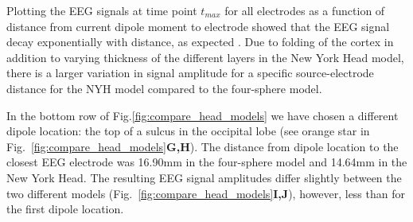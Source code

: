 \documentclass[preprint,10pt,authoryear]{elsarticle}
\begin{document}
{Plotting the EEG signals at time point $t_{max}$ for all electrodes as a function of distance from current dipole moment to electrode showed that the EEG signal decay exponentially with distance, as expected \citep{NUNEZ2006}. Due to folding of the cortex in addition to varying thickness of the different layers in the New York Head model, there is a larger variation in signal amplitude for a specific source-electrode distance for the NYH model compared to the four-sphere model.

In the bottom row of Fig.\ref{fig:compare_head_models} we have chosen a different dipole location: the top of a sulcus in the occipital lobe (see orange star in Fig.~\ref{fig:compare_head_models}\textbf{G,H}). The distance from dipole location to the closest EEG electrode was 16.90mm in the four-sphere model and 14.64mm in the New York Head. The resulting EEG signal amplitudes differ slightly between the two different models (Fig.~\ref{fig:compare_head_models}\textbf{I,J}), however, less than for the first dipole location.
}
%
%
\end{document}
